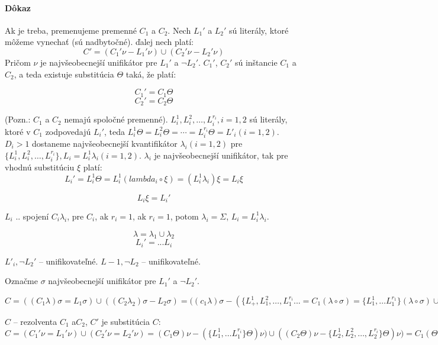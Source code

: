 \paragraph{Dôkaz} Ak je treba, premenujeme premenné $C_1$ a $C_2$. Nech $L_1'$ a
$L_2'$ sú literály, ktoré môžeme vynechať (sú nadbytočné). ďalej nech platí:
$$C' = (C_1' \nu - L_1'\nu) \cup ( C_2'\nu - L_2'\nu)$$
Pričom $\nu$ je najvšeobecnejší unifikátor pre $L_1'$ a $\neg L_2'$. $C_1'$,
$C_2'$ sú inštancie $C_1$ a $C_2$, a teda existuje substitúcia $\Theta$ taká, že
platí:

$$ C_1' = C_1 \Theta $$
$$ C_2' = C_2 \Theta $$

(Pozn.: $C_1$ a $C_2$ nemajú spoločné premenné). $L^1_i, L^2_i, \ldots, L^{r_i}_i,
i=1,2$ sú literály, ktoré v $C_1$ zodpovedajú $L_i'$, teda $L^1_i \Theta = L^2_i
\Theta = \cdots = L^{r_i}_i\Theta = L'_i (i=1,2)$. $D_i > 1$ dostaneme
najvšeobecnejší kvantifikátor $\lambda_i (i=1,2)$ pre $\{ L^1_i, L^2_i, \ldots,
L^{r_i}_i\}, L_i = L^1_i \lambda_i (i=1,2)$. $\lambda_i$ je najvšeobecnejší
unifikátor, tak pre vhodnú substitúciu $\xi$ platí:
$$ L_i' = L^1_i \Theta = L^1_i (lambda_i \circ \xi) = (L^1_i\lambda_i)\xi =
L_i \xi$$

$$L_i\xi = L_i'$$

$L_i$ .. spojení $C_i\lambda_i$, pre $C_i$, ak $r_i = 1$, ak $r_i = 1$, potom
$\lambda_i = \Sigma$, $L_i = L_i^1\lambda_i$.

$$ \lambda = \lambda_1 \cup \lambda_2$$
$$L_i' = \mbox{...} L_i$$

$L'_i, \neg L_2'$ -- unifikovateľné.
$L-1, \neg L_2$ -- unifikovateľné.

Označme $\sigma$ najvšeobecnejší unifikátor pre $L_1'$ a $\neg L_2'$.

$C= ((C_1\lambda)\sigma = L_1\sigma) \cup
((C_2\lambda_2)\sigma-L_2\sigma) = ((c_1\lambda)\sigma - (\{L^1_+, L^2_1,
\ldots, L^{r_i}_1 ...
= C_1(\lambda\circ \sigma) = \{ L^1_1, \ldots L^{r_1}_1 \} (\lambda\circ\sigma)
\cup C_2)(\lambda\circ\sigma) - \{L^1_2, \ldots
L^{r_i}_1\}(\lambda\circ\sigma)$

\par $C$ -- rezolventa $C_1$ a$C_2$, $C'$ je substitúcia $C$:
$C = (C_1' \nu = L_1' \nu) \cup (C_2'\nu = L_2'\nu) = (C_1\Theta)\nu -
(\{L^1_1, \ldots L^{r_i}_1\}\Theta)\nu)\cup ((C_2\Theta)\nu - \{L^1_2, L^2_2,
\ldots, L^{r_i}_2\}\Theta )\nu) = 
C_1(\Theta\circ\nu) - \{L^1_1, \ldots, L^{r_i}_1\} \Theta\circ\nu) \cup
(C_2(\Theta\circ\nu) - \{L^1_2, \ldots L^{r_i}_2\} \Theta\circ\nu)
$

